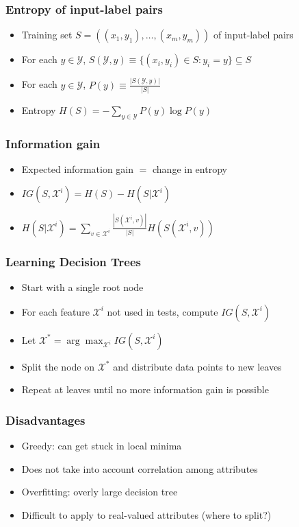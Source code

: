 \documentclass[10pt]{beamer}
\begin{document}
\begin{frame}
  \frametitle{Entropy of input-label pairs}
  \begin{itemize}
    \item Training set $S=((x_1,y_1),\ldots,(x_m,y_m))$ of input-label pairs
	\item For each $y\in\mathcal{Y}$, {\color{red} $S(\mathcal{Y},y)\equiv\{(x_i,y_i)\in S:y_i=y\}\subseteq S$}
	\item For each $y\in\mathcal{Y}$, {\color{blue} $P(y)\equiv\frac{|S(\mathcal{Y},y)|}{|S|}$}
	\item Entropy {\color{green} $H(S)=-\sum_{y\in \mathcal{Y}}P(y)\log P(y)$}
  \end{itemize}
\end{frame}

\begin{frame}
  \frametitle{Information gain}
  \begin{itemize}
    \item Expected information gain $=$ {\color{red} change} in entropy
    \item $IG(S,\mathcal{X}^i)=H(S)-H(S|\mathcal{X}^i)$
    \item $H(S|\mathcal{X}^i)=\sum_{v\in \mathcal{X}^i}
		\frac{|S(\mathcal{X}^i,v)|}{|S|}H(S(\mathcal{X}^i,v))$
  \end{itemize}
\end{frame}

\begin{frame}
  \frametitle{Learning Decision Trees}
  \begin{itemize}
    \item Start with a single root node
	\item For each feature $\mathcal{X}^i$ not used in tests, compute $IG(S, \mathcal{X}^i)$
	\item Let $\mathcal{X}^*=\arg\max_{\mathcal{X}^i} IG(S, \mathcal{X}^i)$
	\item Split the node on $\mathcal{X}^*$ and distribute data points to new leaves
	\item Repeat at leaves until no more information gain is possible
  \end{itemize}
\end{frame}

\begin{frame}
  \frametitle{Disadvantages}
  \begin{itemize}
	\item {\color{red} Greedy}: can get stuck in local minima
	\item Does not take into account correlation among attributes
    \item {\color{blue} Overfitting}: overly large decision tree
    \item Difficult to apply to real-valued attributes (where to split?)
  \end{itemize}
\end{frame}
\end{document}

